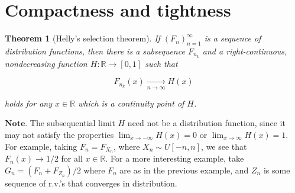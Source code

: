 \documentclass[11pt]{report}
\newcommand{\R}{\mathbb{R}}
\theoremstyle{plain}
\newtheorem{thm}{Theorem}[chapter]
\theoremstyle{definition}
\begin{document}
\section{Compactness and tightness}

\begin{thm}[Helly's selection theorem]
\label{thm-helly}
If $(F_n)_{n=1}^\infty$ is a sequence of distribution
functions, then there is a subsequence $F_{n_k}$ and
a right-continuous, nondecreasing function
$H:\R\to[0,1]$ such that

\[
F_{n_k}(x)\xrightarrow[n\to\infty]{} H(x)
\]

holds for any $x\in\R$ which is a continuity point
of $H$.
\end{thm}

$\textbf{Note.}$ The subsequential limit $H$ need not
be a distribution function, since it may not satisfy
the properties $\lim_{x\to-\infty} H(x) = 0$ or
$\lim_{x\to\infty} H(x)=1$. For example, taking
$F_n = F_{X_n}$, where $X_n \sim U[-n,n]$, we see
that $F_n(x)\to 1/2$ for all $x\in\R$. For a more
interesting example, take $G_n = (F_n + F_{Z_n})/2$
where $F_n$ are as in the previous example, and $Z_n$
is some sequence of r.v.'s that converges in
distribution.
\end{document}
